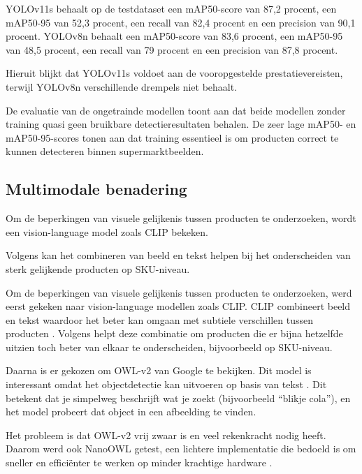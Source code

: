 YOLOv11s behaalt op de testdataset een mAP50-score van 87,2 procent, een mAP50-95 van 52,3 procent, een recall van 82,4 procent en een precision van 90,1 procent. YOLOv8n behaalt een mAP50-score van 83,6 procent, een mAP50-95 van 48,5 procent, een recall van 79 procent en een precision van 87,8 procent.

Hieruit blijkt dat YOLOv11s voldoet aan de vooropgestelde prestatievereisten, terwijl YOLOv8n verschillende drempels niet behaalt.

De evaluatie van de ongetrainde modellen toont aan dat beide modellen zonder training quasi geen bruikbare detectieresultaten behalen. De zeer lage mAP50- en mAP50-95-scores tonen aan dat training essentieel is om producten correct te kunnen detecteren binnen supermarktbeelden.

\subsection{Multimodale benadering}
\label{sec:multimodale_benadering}

Om de beperkingen van visuele gelijkenis tussen producten te onderzoeken, wordt een vision-language model zoals CLIP bekeken.

Volgens \textcite{PETTERSSON202410549} kan het combineren van beeld en tekst helpen bij het onderscheiden van sterk gelijkende producten op SKU-niveau.

Om de beperkingen van visuele gelijkenis tussen producten te onderzoeken, werd eerst gekeken naar vision-language modellen zoals CLIP. CLIP combineert beeld en tekst waardoor het beter kan omgaan met subtiele verschillen tussen producten \autocite{DBLP:journals/corr/abs-2103-00020}. Volgens \textcite{PETTERSSON202410549} helpt deze combinatie om producten die er bijna hetzelfde uitzien toch beter van elkaar te onderscheiden, bijvoorbeeld op SKU-niveau.  

Daarna is er gekozen om OWL-v2 van Google te bekijken. Dit model is interessant omdat het objectdetectie kan uitvoeren op basis van tekst \autocite{minderer2024scalingopenvocabularyobjectdetection}. Dit betekent dat je simpelweg beschrijft wat je zoekt (bijvoorbeeld “blikje cola”), en het model probeert dat object in een afbeelding te vinden. 

Het probleem is dat OWL-v2 vrij zwaar is en veel rekenkracht nodig heeft. Daarom werd ook NanoOWL getest, een lichtere implementatie die bedoeld is om sneller en efficiënter te werken op minder krachtige hardware \autocite{nvidia_nanoowl_2024}. 

